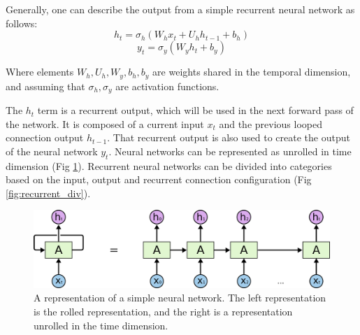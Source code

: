 Generally, one can describe the output from a simple recurrent neural network as follows:
\begin{equation}
h_t = \sigma_h(W_{h} x_t + U_{h} h_{t-1} + b_h)
\end{equation}
\begin{equation}
y_t = \sigma_y(W_{y} h_t + b_y)
\end{equation}

Where elements $W_{h}, U_{h}, W_{y}, b_{h}, b_{y}$ are weights shared in the temporal dimension, and assuming that $\sigma_{h},\sigma_{y}$ are activation functions.

The $h_{t}$ term is a recurrent output, which will be used in the next forward pass of the network.
It is composed of a current input $x_{t}$ and the previous looped connection output $h_{t-1}$.
That recurrent output is also used to create the output of the neural network $y_{t}$.
Neural networks can be represented as unrolled in time dimension (Fig \ref{fig:unroll_rec}).
Recurrent neural networks can be divided into categories based on the input, output and recurrent connection configuration (Fig \ref{fig:recurrent_div}).

\begin{figure}
  \centering
  \includegraphics[width=0.9\linewidth]{figures/chapter3/RNN-unrolled.png}
  \caption{A representation of a simple neural network.
   The left representation is the rolled representation, and the right is a representation unrolled in the time dimension.}
  \label{fig:unroll_rec}
\end{figure}

